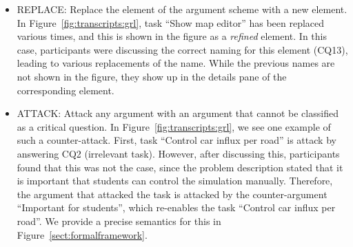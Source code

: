 \begin{itemize}
\item \textsf{REPLACE:} Replace the element of the argument scheme with a new element. In Figure~\ref{fig:transcripts:grl}, task ``Show map editor'' has been replaced various times, and this is shown in the figure as a \emph{refined} element. In this case, participants were discussing the correct naming for this element (CQ13), leading to various replacements of the name. While the previous names are not shown in the figure, they show up in the details pane of the corresponding element. %
\item \textsf{ATTACK:} Attack any argument with an argument that cannot be classified as a critical question. In Figure~\ref{fig:transcripts:grl}, we see one example of such a counter-attack. First, task ``Control car influx per road'' is attack by answering CQ2 (irrelevant task). However, after discussing this, participants found that this was not the case, since the problem description stated that it is important that students can control the simulation manually. Therefore, the argument that attacked the task is attacked by the counter-argument ``Important for students'', which re-enables the task ``Control car influx per road''. We provide a precise semantics for this in Figure~\ref{sect:formalframework}.
\end{itemize}






